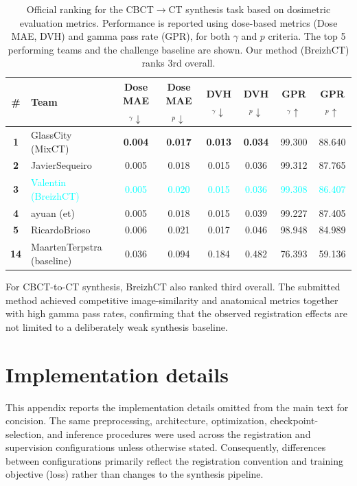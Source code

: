 \documentclass[lettersize,journal]{IEEEtran}
\begin{document}
\begin{table}[h!]
\centering
\scriptsize
\renewcommand{\arraystretch}{1}
\setlength{\tabcolsep}{4pt}
\caption{Official ranking for the CBCT$\rightarrow$CT synthesis task based on dosimetric evaluation metrics. Performance is reported using dose-based metrics (Dose MAE, DVH) and gamma pass rate (GPR), for both $\gamma$ and $p$ criteria. The top 5 performing teams and the challenge baseline are shown. Our method (BreizhCT) ranks 3rd overall.}
\label{tab:cbctct_dose}
\begin{tabular}{clcccccc}
\toprule
\textbf{\#} & \textbf{Team} 
& \textbf{Dose MAE$_\gamma\downarrow$} 
& \textbf{Dose MAE$_p\downarrow$} 
& \textbf{DVH$_\gamma\downarrow$} 
& \textbf{DVH$_p\downarrow$} 
& \textbf{GPR$_\gamma\uparrow$} 
& \textbf{GPR$_p\uparrow$} \\
\midrule
\textbf{1} & GlassCity (MixCT) 
& \textbf{0.004} & \textbf{0.017} & \textbf{0.013} & \textbf{0.034} & 99.300 & 88.640 \\
\textbf{2} & JavierSequeiro 
& 0.005 & 0.018 & 0.015 & 0.036 & 99.312 & 87.765 \\
\textbf{3} & \textcolor{cyan}{Valentin (BreizhCT)} 
& \textcolor{cyan}{0.005} & \textcolor{cyan}{0.020} & \textcolor{cyan}{0.015} & \textcolor{cyan}{0.036} & \textcolor{cyan}{99.308} & \textcolor{cyan}{86.407} \\
\textbf{4} & ayuan (et) 
& 0.005 & 0.018 & 0.015 & 0.039 & 99.227 & 87.405 \\
\textbf{5} & RicardoBrioso 
& 0.006 & 0.021 & 0.017 & 0.046 & 98.948 & 84.989 \\
\midrule
\textbf{14} & MaartenTerpstra (baseline) 
& 0.036 & 0.094 & 0.184 & 0.482 & 76.393 & 59.136 \\
\bottomrule
\end{tabular}

\end{table}

For CBCT-to-CT synthesis, BreizhCT also ranked third overall. The submitted method achieved competitive image-similarity and anatomical metrics together with high gamma pass rates, confirming that the observed registration effects are not limited to a deliberately weak synthesis baseline.

\section{Implementation details}
\label{app:implementation}

This appendix reports the implementation details omitted from the main text for concision. The same preprocessing, architecture, optimization,
checkpoint-selection, and inference procedures were used across the registration and supervision configurations unless otherwise stated. Consequently, differences between configurations primarily reflect the registration convention and training objective (loss) rather than changes to the synthesis pipeline.
\end{document}
